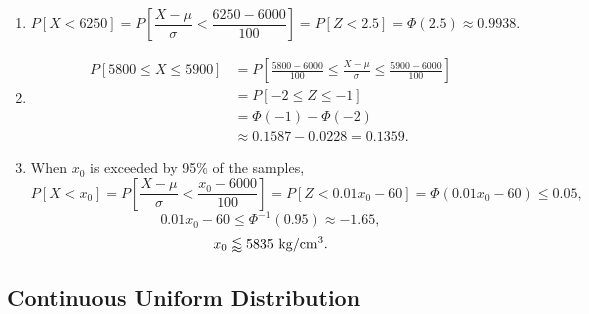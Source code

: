 \documentclass[11pt,a4paper]{article}
\begin{document}
\begin{enumerate}[label=\roman*)]
\item
$$P[X<6250]=P\left[\frac{X-\mu}{\sigma}<\frac{6250-6000}{100}\right]=P[Z<2.5]=\Phi(2.5)\approx0.9938.$$
\item
\begin{align*}
P[5800\leqslant X\leqslant 5900]&=P\left[\frac{5800-6000}{100}\leqslant\frac{X-\mu}{\sigma}\leqslant\frac{5900-6000}{100}\right]\\
&=P[-2\leqslant Z\leqslant -1]\\
&=\Phi(-1)-\Phi(-2)\\
&\approx0.1587-0.0228=0.1359.
\end{align*}
\item
When $x_0$ is exceeded by 95\% of the samples,
$$P[X<x_0]=P\left[\frac{X-\mu}{\sigma}<\frac{x_0-6000}{100}\right]=P[Z<0.01x_0-60]=\Phi(0.01x_0-60)\leqslant 0.05,$$
$$0.01x_0-60\leqslant\Phi^{-1}(0.95)\approx-1.65,$$
$$x_0\lessapprox5835{\rm~kg/cm^3}.$$
\end{enumerate}

\subsection{Continuous Uniform Distribution}
\end{document}
